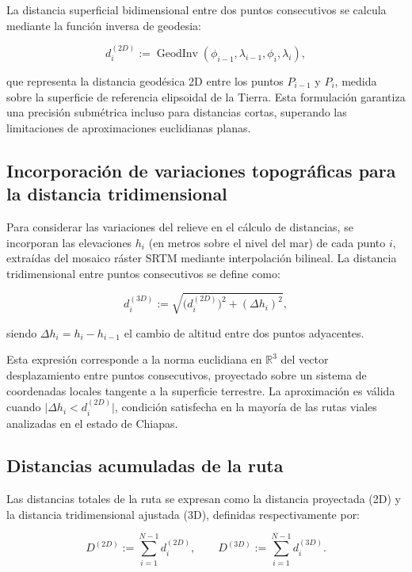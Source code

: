 \documentclass[
  spanish,
  us-letterpaper,
]{scrreprt}
\numberwithin{equation}{section}
\begin{document}
La distancia superficial bidimensional entre dos puntos consecutivos se
calcula mediante la función inversa de geodesia:

\[
d_i^{(2D)} := \operatorname{GeodInv}(\phi_{i-1}, \lambda_{i-1}, \phi_i, \lambda_i),
\]

que representa la distancia geodésica 2D entre los puntos \(P_{i-1}\) y
\(P_i\), medida sobre la superficie de referencia elipsoidal de la
Tierra. Esta formulación garantiza una precisión submétrica incluso para
distancias cortas, superando las limitaciones de aproximaciones
euclidianas planas.

\subsection{Incorporación de variaciones topográficas para la distancia
tridimensional}\label{incorporaciuxf3n-de-variaciones-topogruxe1ficas-para-la-distancia-tridimensional}

Para considerar las variaciones del relieve en el cálculo de distancias,
se incorporan las elevaciones \(h_i\) (en metros sobre el nivel del mar)
de cada punto \(i\), extraídas del mosaico ráster SRTM mediante
interpolación bilineal. La distancia tridimensional entre puntos
consecutivos se define como:

\[
d_i^{(3D)} := \sqrt{\bigl(d_i^{(2D)}\bigr)^2 + (\Delta h_i)^2},
\]

siendo \(\Delta h_i = h_i - h_{i-1}\) el cambio de altitud entre dos
puntos adyacentes.

Esta expresión corresponde a la norma euclidiana en \(\mathbb{R}^3\) del
vector desplazamiento entre puntos consecutivos, proyectado sobre un
sistema de coordenadas locales tangente a la superficie terrestre. La
aproximación es válida cuando \(\lvert \Delta h_i < d_i^{(2D)}\rvert\),
condición satisfecha en la mayoría de las rutas viales analizadas en el
estado de Chiapas.

\subsection{Distancias acumuladas de la
ruta}\label{distancias-acumuladas-de-la-ruta}

Las distancias totales de la ruta se expresan como la distancia
proyectada (2D) y la distancia tridimensional ajustada (3D), definidas
respectivamente por:

\[
D^{(2D)} := \sum_{i=1}^{N-1} d_i^{(2D)}, \qquad
D^{(3D)} := \sum_{i=1}^{N-1} d_i^{(3D)}.
\]
\end{document}

